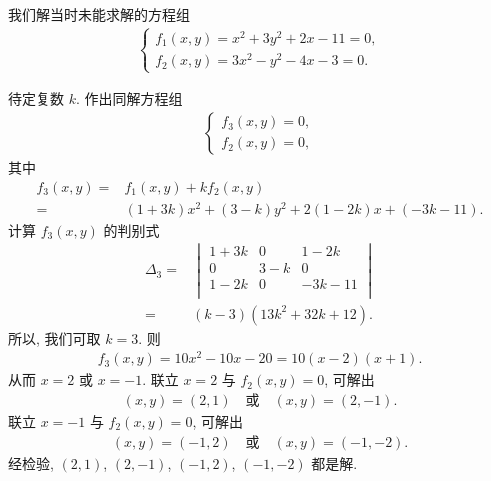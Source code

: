 \documentclass[%
    UTF8,%
    fontset=none,%
    punct=kaiming,%
    zihao=-4,%
    a4paper,%
    oneside,%
]{ctexbook}
\begin{document}
\begingroup
\renewcommand\thmcontinues[1]{%
    续%
}
\begin{example}[continues=emp:A0301]
    我们解当时未能求解的方程组
    \begin{align*}
        \begin{cases}
            f_1 (x, y) = x^2 + 3y^2 + 2x - 11 = 0, \\
            f_2 (x, y) = 3x^2 - y^2 - 4x - 3 = 0.
        \end{cases}
    \end{align*}

    待定复数 \(k\).
    作出同解方程组
    \begin{align*}
        \begin{cases}
            f_3 (x, y) = 0, \\
            f_2 (x, y) = 0,
        \end{cases}
    \end{align*}
    其中
    \begin{align*}
        f_3 (x, y)
        = {} & f_1 (x, y) + kf_2 (x, y)                    \\
        = {} & (1+3k)x^2 + (3-k)y^2 + 2(1-2k)x + (-3k-11).
    \end{align*}
    计算 \(f_3 (x, y)\) 的判别式
    \begin{align*}
        \Delta_3
        = {} & \begin{vmatrix}
                   1+3k & 0   & 1-2k   \\
                   0    & 3-k & 0      \\
                   1-2k & 0   & -3k-11 \\
               \end{vmatrix}      \\
        = {} & (k-3)(13k^2 + 32k + 12).
    \end{align*}
    所以, 我们可取 \(k = 3\).
    则
    \begin{align*}
        f_3 (x, y) = 10x^2 - 10x - 20 = 10(x - 2)(x + 1).
    \end{align*}
    从而 \(x = 2\) 或 \(x = -1\).
    联立 \(x = 2\) 与 \(f_2 (x, y) = 0\),
    可解出
    \begin{align*}
        (x, y) = (2, 1)
        \quad \text{或} \quad
        (x, y) = (2, -1).
    \end{align*}
    联立 \(x = -1\) 与 \(f_2 (x, y) = 0\),
    可解出
    \begin{align*}
        (x, y) = (-1, 2)
        \quad \text{或} \quad
        (x, y) = (-1, -2).
    \end{align*}
    经检验,
    \((2, 1)\), \((2, -1)\), \((-1, 2)\), \((-1, -2)\)
    都是解.
\end{example}
\endgroup
\end{document}
